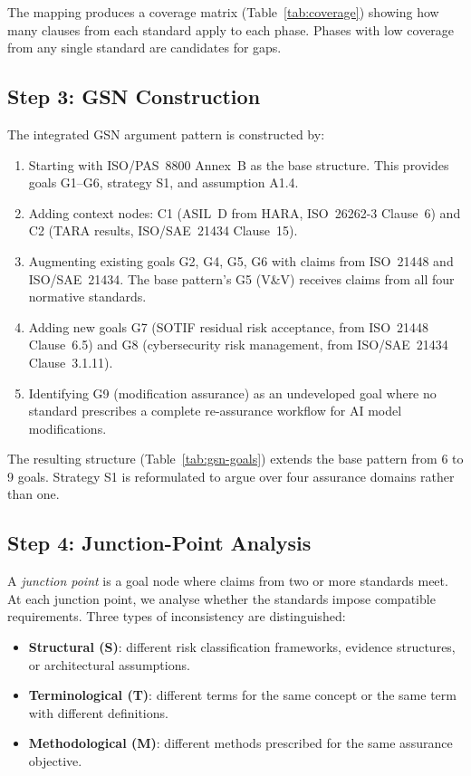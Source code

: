The mapping produces a coverage matrix (Table~\ref{tab:coverage}) showing
how many clauses from each standard apply to each phase. Phases with low
coverage from any single standard are candidates for gaps.

\subsection{Step 3: GSN Construction}\label{sec:step3}

The integrated GSN argument pattern is constructed by:
\begin{enumerate}
    \item Starting with ISO/PAS~8800 Annex~B as the base structure. This
          provides goals G1--G6, strategy S1, and assumption A1.4.
    \item Adding context nodes: C1 (ASIL~D from HARA, ISO~26262-3 Clause~6)
          and C2 (TARA results, ISO/SAE~21434 Clause~15).
    \item Augmenting existing goals G2, G4, G5, G6 with claims from
          ISO~21448 and ISO/SAE~21434. The base pattern's G5 (V\&V)
          receives claims from all four normative standards.
    \item Adding new goals G7 (SOTIF residual risk acceptance, from
          ISO~21448 Clause~6.5) and G8 (cybersecurity risk management,
          from ISO/SAE~21434 Clause~3.1.11).
    \item Identifying G9 (modification assurance) as an undeveloped goal
          where no standard prescribes a complete re-assurance workflow
          for AI model modifications.
\end{enumerate}

The resulting structure (Table~\ref{tab:gsn-goals}) extends the base
pattern from 6 to 9 goals. Strategy S1 is reformulated to argue over
four assurance domains rather than one.

\subsection{Step 4: Junction-Point Analysis}\label{sec:step4}

A \emph{junction point} is a goal node where claims from two or more
standards meet. At each junction point, we analyse whether the standards
impose compatible requirements. Three types of inconsistency are
distinguished:
\begin{itemize}
    \item \textbf{Structural (S)}: different risk classification frameworks,
          evidence structures, or architectural assumptions.
    \item \textbf{Terminological (T)}: different terms for the same concept
          or the same term with different definitions.
    \item \textbf{Methodological (M)}: different methods prescribed for the
          same assurance objective.
\end{itemize}


